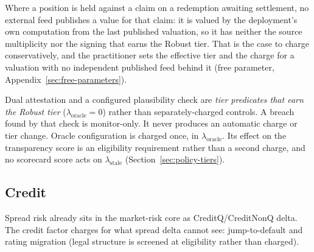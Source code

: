 Where a position is held against a claim on a redemption awaiting settlement, no external feed publishes a value for that claim: it is valued by the deployment's own computation from the last published valuation, so it has neither the source multiplicity nor the signing that earns the Robust tier. That is the case to charge conservatively, and the practitioner sets the effective tier and the charge for a valuation with no independent published feed behind it (free parameter, Appendix~\ref{sec:free-parameters}).

Dual attestation and a configured plausibility check are \emph{tier predicates that earn the Robust tier} ($\lambda_{\mathrm{oracle}}=0$) rather than separately-charged controls. A breach found by that check is monitor-only. It never produces an automatic charge or tier change. Oracle configuration is charged once, in $\lambda_{\mathrm{oracle}}$. Its effect on the transparency score is an eligibility requirement rather than a second charge, and no scorecard score acts on $\lambda_{\mathrm{stale}}$ (Section~\ref{sec:policy-tiers}).

\subsection{Credit}\label{sec:tax-credit}
Spread risk already sits in the market-risk core as CreditQ/CreditNonQ delta. The credit factor charges for what spread delta cannot see: jump-to-default and rating migration (legal structure is screened at eligibility rather than charged).

